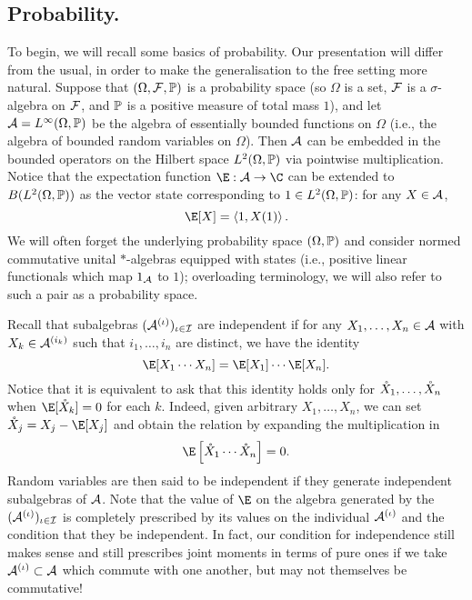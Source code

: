 \subsection{Probability.}
To begin, we will recall some basics of probability.
Our presentation will differ from the usual, in order to make the generalisation to the free setting more natural.
Suppose that $(\Omega, \mathcal{F}, \P)$ is a probability space (so $\Omega$ is a set, $\cF$ is a $\sigma$-algebra on $\cF$, and $\P$ is a positive measure of total mass $1$), and let $\A = L^\infty(\Omega, \P)$ be the algebra of essentially bounded functions on $\Omega$ (i.e., the algebra of bounded random variables on $\Omega$).
Then $\A$ can be embedded in the bounded operators on the Hilbert space $L^2(\Omega, \P)$ via pointwise multiplication.
Notice that the expectation function $\E : \A \to \C$ can be extended to $B(L^2(\Omega, \P))$ as the vector state corresponding to $1 \in L^2(\Omega, \P)$: for any $X \in \A$,
$$\E[X] = \ang{1, X(1)}.$$
We will often forget the underlying probability space $(\Omega, \P)$ and consider normed commutative unital $*$-algebras equipped with states (i.e., positive linear functionals which map $1_\A$ to $1$); overloading terminology, we will also refer to such a pair as a probability space.

Recall that subalgebras $(\A^{(\iota)})_{\iota\in\I}$ are independent if for any $X_1, \ldots, X_n \in \A$ with $X_k \in \A^{(i_k)}$ such that $i_1, \ldots, i_n$ are distinct, we have the identity
$$\E[X_1\cdots X_n] = \E[X_1]\cdots\E[X_n].$$
Notice that it is equivalent to ask that this identity holds only for $\oX_1, \ldots, \oX_n$ when $\E[\oX_k] = 0$ for each $k$.
Indeed, given arbitrary $X_1, \ldots, X_n$, we can set $\oX_j = X_j - \E[X_j]$ and obtain the relation by expanding the multiplication in
$$\E\sq{\oX_1\cdots\oX_n} = 0.$$
Random variables are then said to be independent if they generate independent subalgebras of $\A$.
Note that the value of $\E$ on the algebra generated by the $(\A^{(\iota)})_{\iota\in\I}$ is completely prescribed by its values on the individual $\A^{(\iota)}$ and the condition that they be independent.
In fact, our condition for independence still makes sense and still prescribes joint moments in terms of pure ones if we take $\A^{(\iota)} \subset \A$ which commute with one another, but may not themselves be commutative!

